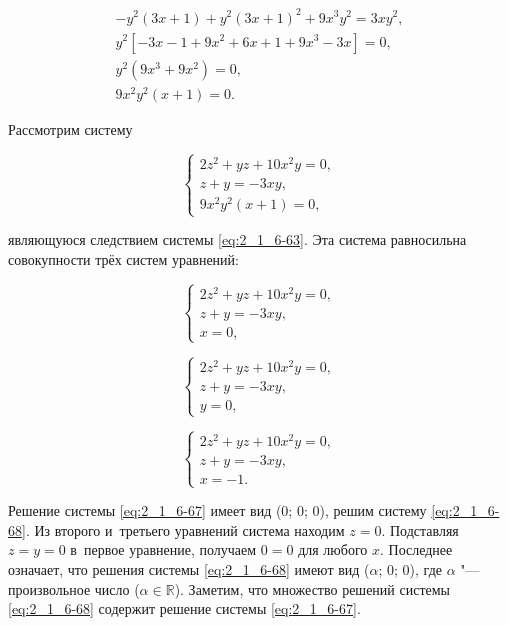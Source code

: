 \begin{gather}
-y^{2}(3x + 1) + y^{2}(3x + 1)^{2} + 9x^{3}y^{2} = 3xy^{2}, \nonumber \\
y^{2}\left[-3x - 1 + 9x^{2} + 6{x} + 1 + 9x^{3} - 3x\right] = 0, \nonumber \\
y^{2}(9x^{3} + 9x^{2}) = 0, \nonumber \\
9x^{2}y^{2}(x + 1) = 0. \label{eq:2_1_6-65}
\end{gather}

Рассмотрим систему

\begin{equation}\label{eq:2_1_6-66}
\begin{cases}
2z^{2} + yz + 10x^{2}y = 0, \\
z + y = -3xy, \\
9x^{2}y^{2}(x + 1) = 0,
\end{cases}
\end{equation}

\noindent
являющуюся следствием системы \eqref{eq:2_1_6-63}. Эта система равносильна
совокупности трёх систем уравнений:

\begin{equation}\label{eq:2_1_6-67}
\begin{cases}
2z^{2} + yz + 10x^{2}y = 0, \\
z + y = -3xy, \\
x = 0,
\end{cases}
\end{equation}

\begin{equation}\label{eq:2_1_6-68}
\begin{cases}
2z^{2} + yz + 10x^{2}y = 0, \\
z + y = -3xy, \\
y = 0,
\end{cases}
\end{equation}

\begin{equation}\label{eq:2_1_6-69}
\begin{cases}
2z^{2} + yz + 10x^{2}y = 0, \\
z + y = -3xy, \\
x = -1.
\end{cases}
\end{equation}

Решение системы \eqref{eq:2_1_6-67} имеет вид (0; 0; 0),
решим систему \eqref{eq:2_1_6-68}.
Из второго и~третьего уравнений система находим $z = 0$.
Подставляя $z = y = 0$ в~первое уравнение, получаем $0 = 0$ для любого $x$.
Последнее означает, что решения системы \eqref{eq:2_1_6-68} имеют вид
($\alpha$; 0; 0), где $\alpha$ "--- произвольное число ($\alpha \in \mathbb{R}$).
Заметим, что множество решений системы \eqref{eq:2_1_6-68} содержит решение системы
\eqref{eq:2_1_6-67}.

